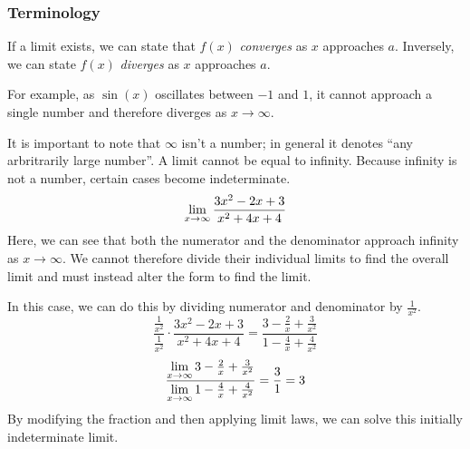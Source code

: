 \documentclass[12pt]{report}
\begin{document}
\begin{flushleft}
\subsubsection*{Terminology}
If a limit exists, we can state that \(f(x)\) \textit{converges} as \(x\) 
approaches \(a\). Inversely, we can state \(f(x)\) \textit{diverges} as \(x\)
approaches \(a\). \par
For example, as \(\sin(x)\) oscillates between \(-1\) and \(1\), it cannot 
approach a single number and therefore diverges as \(x\rightarrow\infty\). \par
It is important to note that \(\infty\) isn't a number; in general it denotes
``any arbritrarily large number''. A limit cannot be equal to infinity. Because
infinity is not a number, certain cases become indeterminate.
\[\lim\limits_{x\rightarrow\infty} \frac{3x^2 - 2x + 3}{x^2 + 4x + 4}\]
Here, we can see that both the numerator and the denominator approach infinity
as \(x\rightarrow\infty\). We cannot therefore divide their individual limits 
to find the overall limit and must instead alter the form to find the limit. 
\par
In this case, we can do this by dividing numerator and denominator by 
\(\frac{1}{x^2}\).
\[\frac{\frac{1}{x^2}}{\frac{1}{x^2}} \cdot \frac{3x^2 - 2x + 3}{x^2 + 4x + 4}
= \frac{3 - \frac{2}{x} + \frac{3}{x^2}}{1 - \frac{4}{x} + \frac{4}{x^2}}\]
\[\frac{\lim\limits_{x\rightarrow\infty} 3 - \frac{2}{x} + \frac{3}{x^2}}{
\lim\limits_{x\rightarrow\infty} 1 - \frac{4}{x} + \frac{4}{x^2}} = 
\frac{3}{1} = 3\]
By modifying the fraction and then applying limit laws, we can solve this 
initially indeterminate limit.


\end{flushleft}
\end{document}
